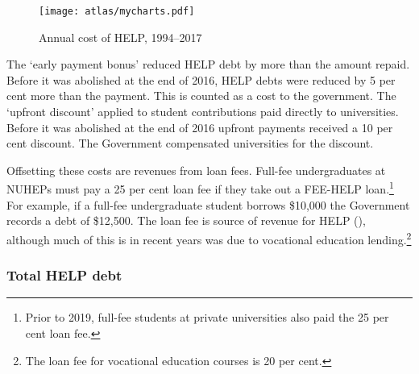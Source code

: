 \documentclass{grattan}
\begin{document}
    \begin{figure} %
    \caption{Annual cost of HELP, 1994--2017}\label{fig:annual-cost-of-help-19942017}
    \texttt{[image: atlas/mycharts.pdf]}
    \end{figure}

The `early payment bonus' reduced HELP debt by more than the amount repaid. Before it was abolished at the end of 2016, HELP debts were reduced by 5 per cent more than the payment. This is counted as a cost to the government. The `upfront discount' applied to student contributions paid directly to universities. Before it was abolished at the end of 2016 upfront payments received a 10 per cent discount. The Government compensated universities for the discount.



Offsetting these costs are revenues from loan fees. Full-fee undergraduates at NUHEPs must pay a 25 per cent loan fee if they take out a FEE-HELP loan.\footnote{Prior to 2019, full-fee students at private universities also paid the 25 per cent loan fee.} For example, if a full-fee undergraduate student borrows \$10,000 the Government records a debt of \$12,500. The loan fee is source of revenue for HELP (), although much of this is in recent years was due to vocational education lending.\footnote{The loan fee for vocational education courses is 20 per cent.}

%
\subsubsection{Total HELP debt}\label{subsubsec:total-help-debt}
\end{document}
